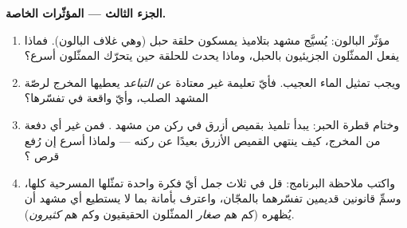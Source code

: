 \begin{problem}
\medskip\noindent\textbf{الجزء الثالث --- المؤثّرات الخاصة.}
\begin{enumerate}[resume]
  \item مؤثّر البالون: يُسيَّج مشهد  بتلاميذ يمسكون حلقة
        حبل (وهي غلاف البالون). فماذا يفعل الممثّلون الجزيئيون
        بالحبل، وماذا يحدث للحلقة حين يتحرّك الممثّلون أسرع؟
  \item ويجب تمثيل  الماء العجيب. فأيّ تعليمة غير معتادة
        عن \emph{التباعد} يعطيها المخرج لرصّة المشهد الصلب،
        وأيّ واقعة في  تفسّرها؟
  \item وختام قطرة الحبر: يبدأ تلميذ بقميص أزرق في ركن من مشهد
        \emph{}. فمن غير أي دفعة من المخرج، كيف ينتهي
        القميص الأزرق بعيدًا عن ركنه --- ولماذا أسرع إن رُفع
        قرص ؟
  \item واكتب ملاحظة البرنامج: قل في ثلاث جمل أيّ فكرة واحدة
        تمثّلها المسرحية كلها، وسمِّ قانونين قديمين تفسّرهما
        بالمجّان، واعترف بأمانة بما لا يستطيع أي مشهد أن يُظهره
        (كم هم \emph{صغار} الممثّلون الحقيقيون وكم هم
        \emph{كثيرون}).
\end{enumerate}
\end{problem}
